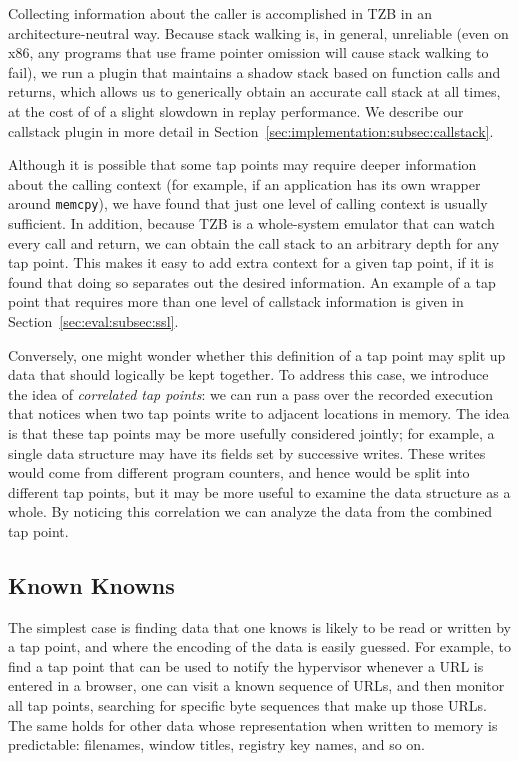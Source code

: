 Collecting information about the caller is accomplished in TZB in an
architecture-neutral way. Because stack walking is, in general,
unreliable (even on x86, any programs that use frame pointer omission
will cause stack walking to fail), we run a plugin that maintains a
shadow stack based on function calls and returns, which allows us to
generically obtain an accurate call stack at all times, at the cost of
of a slight slowdown in replay performance. We describe our 
callstack plugin in more detail in
Section~\ref{sec:implementation:subsec:callstack}.

Although it is possible that some tap points may require deeper
information about the calling context (for example, if an application
has its own wrapper around \texttt{memcpy}), we have found that just one
level of calling context is usually sufficient. In addition, because TZB
is a whole-system emulator that can watch every call and return, we can
obtain the call stack to an arbitrary depth for any tap point. This
makes it easy to add extra context for a given tap point, if it is found
that doing so separates out the desired information. An example of a tap
point that requires more than one level of callstack information is
given in Section~\ref{sec:eval:subsec:ssl}.

Conversely, one might wonder whether this definition of a tap point may
split up data that should logically be kept together. To address this
case, we introduce the idea of \emph{correlated tap points}: we can run
a pass over the recorded execution that notices when two tap points
write to adjacent locations in memory. The idea is that these tap points
may be more usefully considered jointly; for example, a single data
structure may have its fields set by successive writes. These writes
would come from different program counters, and hence would be split
into different tap points, but it may be more useful to examine the data
structure as a whole. By noticing this correlation we can analyze the
data from the combined tap point.

\subsection{Known Knowns}

The simplest case is finding data that one knows is likely to be read or
written by a tap point, and where the encoding of the data is easily
guessed. For example, to find a tap point that can be used to notify
the hypervisor whenever a URL is entered in a browser, one can visit a
known sequence of URLs, and then monitor all tap points, searching for
specific byte sequences that make up those URLs. The same holds for
other data whose representation when written to memory is predictable:
filenames, window titles, registry key names, and so on.

